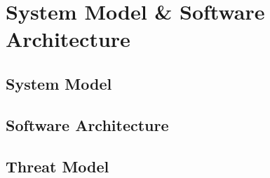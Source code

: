 
%

\makeatletter
\newcommand{\ntifpkgloaded}{%
  \@ifpackageloaded%
}
\makeatother


\chapter{System Model \& Software Architecture}\label{cha:system_model}

\section{System Model}\label{sec:system_model}

\section{Software Architecture}\label{sec:software_architecture}

\section{Threat Model}\label{sec:threat_model}